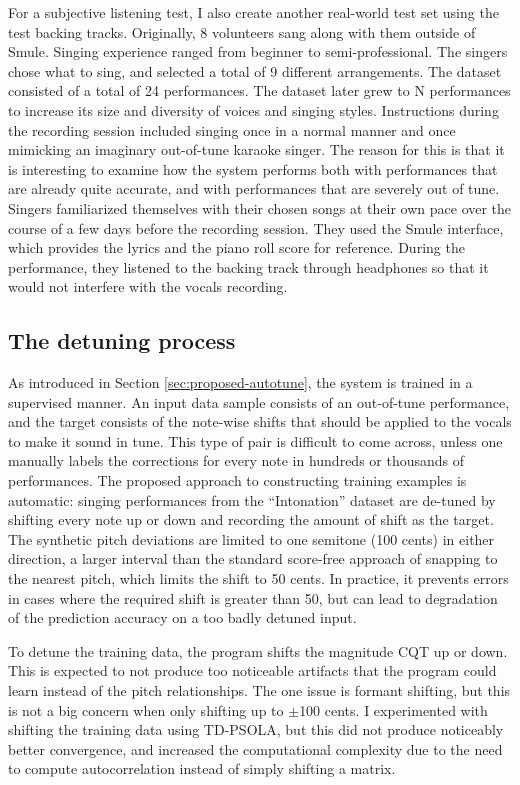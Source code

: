 For a subjective listening test, I also create another real-world test set using the test backing tracks. Originally, 8 volunteers sang along with them outside of Smule. Singing experience ranged from beginner to semi-professional. The singers chose what to sing, and selected a total of 9 different arrangements. The dataset consisted of a total of 24 performances. The dataset later grew to N performances to increase its size and diversity of voices and singing styles. Instructions during the recording session included singing once in a normal manner and once mimicking an imaginary out-of-tune karaoke singer. The reason for this is that it is interesting to examine how the system performs both with performances that are already quite accurate, and with performances that are severely out of tune. Singers familiarized themselves with their chosen songs at their own pace over the course of a few days before the recording session. They used the Smule interface, which provides the lyrics and the piano roll score for reference. During the performance, they listened to the backing track through headphones so that it would not interfere with the vocals recording.

\subsection{The detuning process}
As introduced in Section \ref{sec:proposed-autotune}, the system is trained in a supervised manner. An input data sample consists of an out-of-tune performance, and the target consists of the note-wise shifts that should be applied to the vocals to make it sound in tune. This type of pair is difficult to come across, unless one manually labels the corrections for every note in hundreds or thousands of performances. The proposed approach to constructing training examples is automatic: singing performances from the ``Intonation'' dataset are de-tuned by shifting every note up or down and recording the amount of shift as the target. The synthetic pitch deviations are limited to one semitone (100 cents) in either direction, a larger interval than the standard score-free approach of snapping to the nearest pitch, which limits the shift to 50 cents. In practice, it prevents errors in cases where the required shift is greater than 50, but can lead to degradation of the prediction accuracy on a too badly detuned input. 

To detune the training data, the program shifts the magnitude CQT up or down. This is expected to not produce too noticeable artifacts that the program could learn instead of the pitch relationships. The one issue is formant shifting, but this is not a big concern when only shifting up to $\pm$100 cents. I experimented with shifting the training data using TD-PSOLA, but this did not produce noticeably better convergence, and increased the computational complexity due to the need to compute autocorrelation instead of simply shifting a matrix. 

